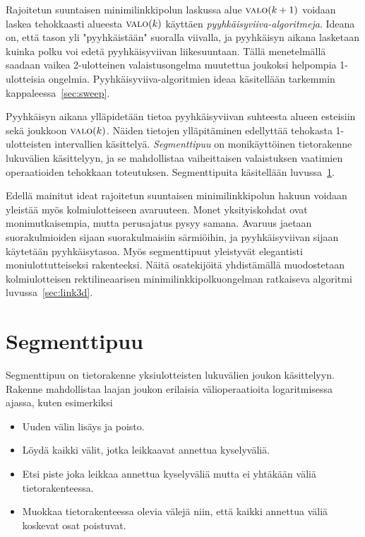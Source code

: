 \documentclass[finnish]{tktltiki2}
\theoremstyle{definition}
\theoremstyle{remark}
\newcommand\reach[1]{\ensuremath{\textsc{valo}(#1)}\xspace}
\begin{document}
Rajoitetun suuntaisen minimilinkkipolun laskussa alue \reach{k+1} voidaan laskea tehokkaasti alueesta \reach{k} käyttäen \emph{pyyhkäisyviiva-algoritmeja}.
Ideana on, että tason yli "pyyhkäistään" suoralla viivalla, ja pyyhkäisyn aikana lasketaan kuinka polku voi edetä pyyhkäisyviivan liikesuuntaan.
Tällä menetelmällä saadaan vaikea 2-ulotteinen valaistusongelma muutettua joukoksi helpompia 1-ulotteisia ongelmia.
Pyyhkäisyviiva-algoritmien ideaa käsitellään tarkemmin kappaleessa~\ref{sec:sweep}.

Pyyhkäisyn aikana ylläpidetään tietoa pyyhkäisyviivan suhteesta alueen esteisiin sekä joukkoon \reach{k}.
Näiden tietojen ylläpitäminen edellyttää tehokasta 1-ulotteisten intervallien käsittelyä.
\emph{Segmenttipuu} on monikäyttöinen tietorakenne lukuvälien käsittelyyn, ja se mahdollistaa vaiheittaisen valaistuksen vaatimien operaatioiden tehokkaan toteutuksen.
Segmenttipuita käsitellään luvussa~\ref{sec:segtree}.

Edellä mainitut ideat rajoitetun suuntaisen minimilinkkipolun hakuun voidaan yleistää myös kolmiulotteiseen avaruuteen.
Monet yksityiskohdat ovat monimutkaisempia, mutta perusajatus pysyy samana.
Avaruus jaetaan suorakulmioiden sijaan suorakulmaisiin särmiöihin, ja pyyhkäisyviivan sijaan käytetään pyyhkäisytasoa.
Myös segmenttipuut yleistyvät elegantisti moniulottutteiseksi rakenteeksi.
Näitä osatekijöitä yhdistämällä muodostetaan kolmiulotteisen rektilineaarisen minimilinkkipolkuongelman ratkaiseva algoritmi luvussa~\ref{sec:link3d}.



\section{Segmenttipuu}\label{sec:segtree}

Segmenttipuu on tietorakenne yksiulotteisten lukuvälien joukon käsittelyyn.
Rakenne mahdollistaa laajan joukon erilaisia välioperaatioita logaritmisessa ajassa, kuten esimerkiksi
\begin{itemize}
	\item Uuden välin lisäys ja poisto.
	\item Löydä kaikki välit, jotka leikkaavat annettua kyselyväliä.
	\item Etsi piste joka leikkaa annettua kyselyväliä mutta ei yhtäkään väliä tietorakenteessa.
	\item Muokkaa tietorakenteessa olevia välejä niin, että kaikki annettua väliä koskevat osat poistuvat.
\end{itemize}
\end{document}
